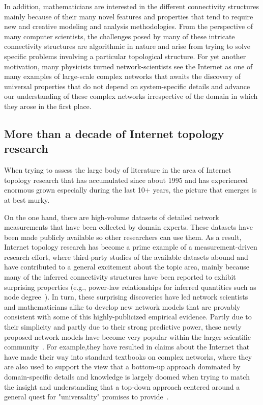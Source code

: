 \documentclass{sig-alternate-10pt}
\begin{document}
In addition, mathematicians are interested in the different connectivity structures mainly because of their many novel features and properties that tend to require new and creative
modeling and analysis methodologies. From the perspective of many computer scientists, the challenges posed by many of these intricate connectivity structures are algorithmic in nature and arise from trying to solve specific problems involving a particular topological structure. For yet another motivation, many physicists turned network-scientists see the Internet as one of many examples of large-scale complex networks that awaits 
the discovery of universal properties that do not depend on system-specific details and advance our understanding of these complex networks irrespective of the domain in which they arose in the first place.

\subsection{More than a decade of Internet topology research}

When trying to assess the large body of literature in the area of Internet topology research that has accumulated since about 1995 and has experienced enormous grown especially during the
last 10+ years, the picture that emerges is at best murky.  

On the one hand, there are high-volume datasets of detailed network measurements that have been collected by domain experts.  These datasets have been made publicly available so other researchers can use them.  As a result, Internet topology research has become a prime example of a measurement-driven research effort, where third-party studies of the available 
datasets abound and have contributed to a general excitement about the topic area, mainly because many of the inferred connectivity structures have been reported to exhibit surprising 
properties (e.g., power-law relationships for inferred quantities such as node degree~\cite{f3_1999}). In turn, these surprising discoveries have led network scientists and mathematicians alike to develop new network models that are provably consistent with some of this highly-publicized empirical evidence.  Partly due to their simplicity and partly due to their strong predictive power, these newly proposed network models have become very popular within the larger scientific community~\cite{nature00,science09,science11}. For example,they have resulted in claims about the Internet that have made their way into standard textbooks on complex networks, where they are also used to support the view that a bottom-up approach dominated by domain-specific details and knowledge is largely doomed when trying to match the insight and understanding that a top-down approach centered around a general quest for "universality" promises to provide~\cite{book1,book2,book3,book4}. 
\end{document}
